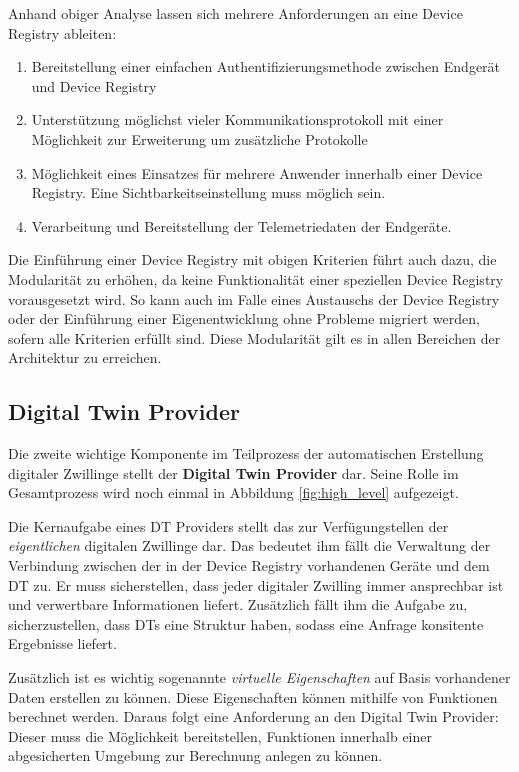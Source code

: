 Anhand obiger Analyse lassen sich mehrere Anforderungen an eine Device Registry ableiten:

\begin{enumerate}
    \item Bereitstellung einer einfachen Authentifizierungsmethode zwischen Endgerät und Device Registry
    \item Unterstützung möglichst vieler Kommunikationsprotokoll mit einer Möglichkeit zur Erweiterung um zusätzliche Protokolle
    \item Möglichkeit eines Einsatzes für mehrere Anwender innerhalb einer Device Registry. Eine Sichtbarkeitseinstellung muss möglich sein.
    \item Verarbeitung und Bereitstellung der Telemetriedaten der Endgeräte.
\end{enumerate}

Die Einführung einer Device Registry mit obigen Kriterien führt auch dazu, die Modularität zu erhöhen, da keine Funktionalität einer speziellen Device Registry vorausgesetzt wird. So kann auch im Falle eines Austauschs der Device Registry oder der Einführung einer Eigenentwicklung ohne Probleme migriert werden, sofern alle Kriterien erfüllt sind. Diese Modularität gilt es in allen Bereichen der Architektur zu erreichen.

\subsection{Digital Twin Provider}

Die zweite wichtige Komponente im Teilprozess der automatischen Erstellung digitaler Zwillinge stellt der \textbf{Digital Twin Provider} dar. Seine Rolle im Gesamtprozess wird noch einmal in Abbildung \vref{fig:high_level} aufgezeigt.

Die Kernaufgabe eines \ac{DT} Providers stellt das zur Verfügungstellen der \textit{eigentlichen} digitalen Zwillinge dar. Das bedeutet ihm fällt die Verwaltung der Verbindung zwischen der in der Device Registry vorhandenen Geräte und dem \ac{DT} zu. Er muss sicherstellen, dass jeder digitaler Zwilling immer ansprechbar ist und verwertbare Informationen liefert. Zusätzlich fällt ihm die Aufgabe zu, sicherzustellen, dass \ac{DT}s eine Struktur haben, sodass eine Anfrage konsitente Ergebnisse liefert.

Zusätzlich ist es wichtig sogenannte \textit{virtuelle Eigenschaften} auf Basis vorhandener Daten erstellen zu können. Diese Eigenschaften können mithilfe von Funktionen berechnet werden. Daraus folgt eine Anforderung an den Digital Twin Provider: Dieser muss die Möglichkeit bereitstellen, Funktionen innerhalb einer abgesicherten Umgebung zur Berechnung anlegen zu können.

